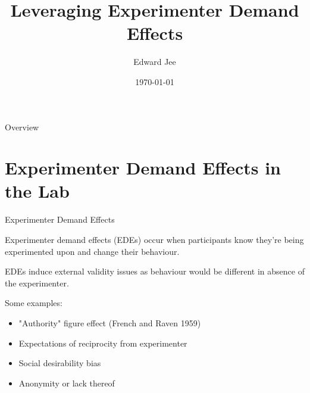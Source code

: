 \documentclass[aspectratio=169,xcolor=dvipsnames]{beamer}
\title[Experimenter Demand]{Leveraging Experimenter Demand Effects} %
\author[Ed Jee] {Edward Jee}
\institute[UChicago] %
{
}
\date{\today} %
\begin{document}
\begin{frame}
    \titlepage
\end{frame}

\begin{frame}{Overview}
    \tableofcontents
\end{frame}

\section{Experimenter Demand Effects in the Lab}

\begin{frame}{Experimenter Demand Effects}
    
    Experimenter demand effects (EDEs)  occur when participants know they're being experimented upon 
    and change their behaviour.

    \vfill
    EDEs induce external validity issues as behaviour would be different in 
    absence of the experimenter.

    Some examples:
    \begin{itemize}
        \item "Authority" figure effect (French and Raven 1959)
        \item Expectations of reciprocity from experimenter
        \item Social desirability bias
        \item Anonymity or lack thereof
    \end{itemize}
\end{frame}
\end{document}
